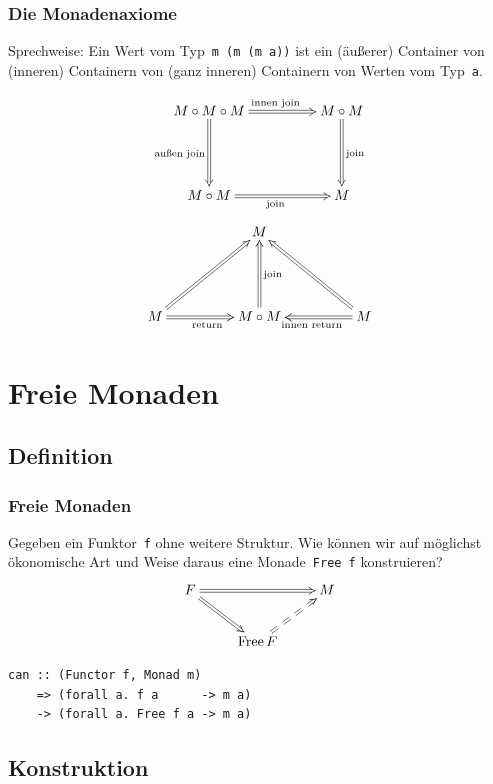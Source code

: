 \documentclass[12pt,compress,ngerman,utf8,t]{beamer}
\begin{document}
\begin{frame}\frametitle{Die Monadenaxiome}
  {\scriptsize
  Sprechweise: Ein Wert vom Typ~\texttt{m (m (m a))} ist ein (äußerer) Container von
  (inneren) Containern von (ganz inneren) Containern von Werten vom
  Typ~\texttt{a}.\par}

  \[ \xymatrixcolsep{4pc}\xymatrixrowsep{4pc}\xymatrix{
    M \circ M \circ M \ar@{=>}[r]^{\text{innen join}} \ar@{=>}[d]_{\text{außen join}} & M \circ M
    \ar@{=>}[d]^{\text{join}} \\
    M \circ M \ar@{=>}[r]_{\text{join}} & M
  } \]
  \medskip
  \[ \xymatrixcolsep{4pc}\xymatrixrowsep{4pc}\xymatrix{
    & M \\
    M \ar@{=>}[r]_{\text{return}}\ar@{=>}[ru] & M \circ M \ar@{=>}[u]_{\text{join}} & \ar@{=>}[l]^{\text{innen
    return}}\ar@{=>}[lu] M
  } \]
\end{frame}



\section{Freie Monaden}

\subsection{Definition}

\begin{frame}[fragile]\frametitle{Freie Monaden}
  Gegeben ein Funktor~\texttt{f} ohne weitere Struktur. Wie können wir auf
  möglichst ökonomische Art und Weise daraus eine
  Monade~\texttt{Free f} konstruieren?
  \[ \xymatrix{
    F \ar@{=>}[rr] \ar@{=>}[rd] && M \\
    & \operatorname{Free} F \ar@{==>}[ru]
  } \]
  \begin{verbatim}
can :: (Functor f, Monad m)
    => (forall a. f a      -> m a)
    -> (forall a. Free f a -> m a)
  \end{verbatim}
\end{frame}


\subsection{Konstruktion}

\end{document}
